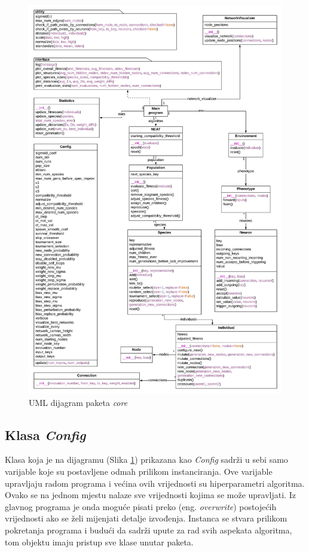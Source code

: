 \documentclass[times, utf8, diplomski, numeric]{fer}
\begin{document}
\begin{figure}
  \centering
  \includegraphics[width=\textwidth]{slika8}
  \caption{UML dijagram paketa \textit{core}}
  \label{slika8}
\end{figure}

\subsection{Klasa \textit{Config}}
Klasa koja je na dijagramu (Slika \ref{slika8}) prikazana kao \textit{Config} sadrži u sebi samo varijable koje su postavljene odmah prilikom instanciranja. Ove varijable upravljaju radom programa i većina ovih vrijednosti su hiperparametri algoritma. Ovako se na jednom mjestu nalaze sve vrijednosti kojima se može upravljati. Iz glavnog programa je onda moguće pisati preko (eng. \textit{overwrite}) postojećih vrijednosti ako se želi mijenjati detalje izvođenja. Instanca se stvara prilikom pokretanja programa i budući da sadrži upute za rad svih aspekata algoritma, tom objektu imaju pristup sve klase unutar paketa.
\end{document}
